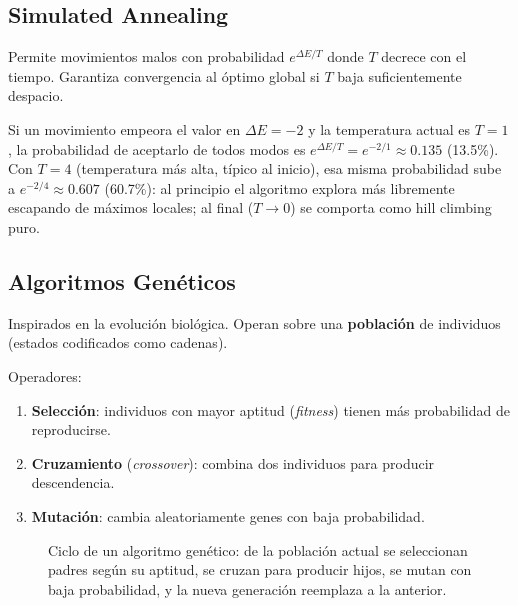 \subsection{Simulated Annealing}

Permite movimientos malos con probabilidad $e^{\Delta E / T}$ donde $T$ decrece con el tiempo. Garantiza convergencia al óptimo global si $T$ baja suficientemente despacio.

\begin{example}
    Si un movimiento empeora el valor en $\Delta E = -2$ y la temperatura actual es $T=1$, la probabilidad de
    aceptarlo de todos modos es $e^{\Delta E/T} = e^{-2/1} \approx 0.135$ (13.5\%). Con $T=4$ (temperatura más alta,
    típico al inicio), esa misma probabilidad sube a $e^{-2/4} \approx 0.607$ (60.7\%): al principio el algoritmo
    explora más libremente escapando de máximos locales; al final ($T \to 0$) se comporta como hill climbing puro.
\end{example}

\subsection{Algoritmos Genéticos}

Inspirados en la evolución biológica. Operan sobre una \textbf{población} de individuos (estados codificados como cadenas).

Operadores:
\begin{enumerate}
    \item \textbf{Selección}: individuos con mayor aptitud (\textit{fitness}) tienen más probabilidad de reproducirse.
    \item \textbf{Cruzamiento} (\textit{crossover}): combina dos individuos para producir descendencia.
    \item \textbf{Mutación}: cambia aleatoriamente genes con baja probabilidad.
\end{enumerate}

\begin{figure}[H]
\centering
{}
\caption{Ciclo de un algoritmo genético: de la población actual se seleccionan padres según su aptitud, se cruzan
para producir hijos, se mutan con baja probabilidad, y la nueva generación reemplaza a la anterior.}
\end{figure}

